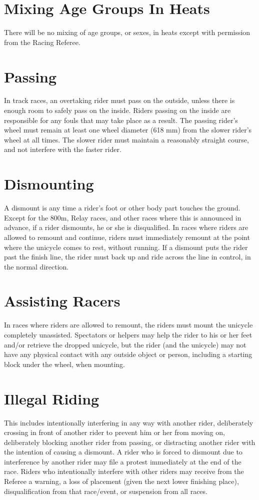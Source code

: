 \section{Mixing Age Groups In Heats}
There will be no mixing of age groups, or sexes, in heats except with permission from the Racing Referee.

\section{Passing}
In track races, an overtaking rider must pass on the outside, unless there is enough room to safely pass on the inside.
Riders passing on the inside are responsible for any fouls that may take place as a result.
The passing rider's wheel must remain at least one wheel diameter (618 mm) from the slower rider's wheel at all times.
The slower rider must maintain a reasonably straight course, and not interfere with the faster rider.

\section{Dismounting}
A dismount is any time a rider's foot or other body part touches the ground.
Except for the 800m, Relay races, and other races where this is announced in advance, if a rider dismounts, he or she is disqualified.
In races where riders are allowed to remount and continue, riders must immediately remount at the point where the unicycle comes to rest, without running.
If a dismount puts the rider past the finish line, the rider must back up and ride across the line in control, in the normal direction.

\section{Assisting Racers}
In races where riders are allowed to remount, the riders must mount the unicycle completely unassisted.
Spectators or helpers may help the rider to his or her feet and/or retrieve the dropped unicycle, but the rider (and the unicycle) may not have any physical contact with any outside object or person, including a starting block under the wheel, when mounting.

\section{Illegal Riding}
This includes intentionally interfering in any way with another rider, deliberately crossing in front of another rider to prevent him or her from moving on, deliberately blocking another rider from passing, or distracting another rider with the intention of causing a dismount.
A rider who is forced to dismount due to interference by another rider may file a protest immediately at the end of the race.
Riders who intentionally interfere with other riders may receive from the Referee a warning, a loss of placement (given the next lower finishing place), disqualification from that race/event, or suspension from all races.

